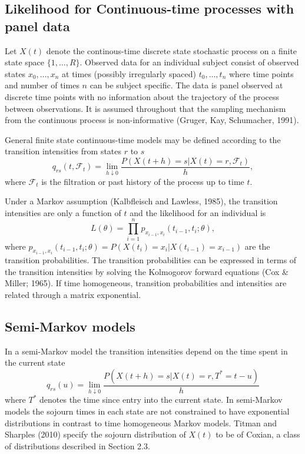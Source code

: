 \documentclass{uwstat572}
\begin{document}
\subsection{Likelihood for Continuous-time processes with panel data}
Let $X(t)$ denote the continous-time discrete state stochastic process on a finite state space $\{1,\ldots,R\}$. Observed data for an individual subject consist of observed states $x_0 ,\ldots, x_n$ at times (possibly irregularly spaced) $t_0,\ldots,t_n$ where time points and number of times $n$ can be subject specific. The data is panel observed at discrete time points with no information about the trajectory of the process between observations. It is assumed throughout that the sampling mechanism from the continuous process is non-informative (Gruger, Kay, Schumacher, 1991).

General finite state continuous-time models may be defined according to the transition intensities from states $r$ to $s$
\[
q_{rs}(t,\mathcal{F}_t) =\lim_{h \downarrow 0} \frac{P(X(t+h)=s|X(t) = r, \mathcal{F}_t)}{h},
\]
where $\mathcal{F}_t$ is the filtration or past history of the process up to time $t$.

Under a Markov assumption (Kalbfleisch and Lawless, 1985), the transition intensities are only a function of $t$ and the likelihood for an individual is
\[
L(\theta) = \prod_{i=1}^n p_{x_{i-1},x_i} (t_{i-1},t_i;\theta),
\]
where $p_{x_{i-1},x_i} (t_{i-1},t_i;\theta)=P(X(t_i)=x_i | X(t_{i-1})=x_{i-1})$ are the transition probabilities. The transition probabilities can be expressed in terms of the transition intensities by solving the Kolmogorov forward equations (Cox \& Miller; 1965). If time homogeneous, transition probabilities and intensities are related through a matrix exponential.

\subsection{Semi-Markov models}
In a semi-Markov model the transition intensities depend on the time spent in the current state
\[
q_{rs} (u) = \lim_{h \downarrow 0} \frac{P(X(t+h) = s | X(t) = r, T^* = t-u)}{h}
\]
where $T^*$ denotes the time since entry into the current state. In semi-Markov models the sojourn times in each state are not constrained to have exponential distributions in contrast to time homogeneous Markov models. Titman and Sharples (2010) specify the sojourn distribution of $X(t)$ to be of Coxian, a class of distributions described in Section 2.3.
\end{document}
